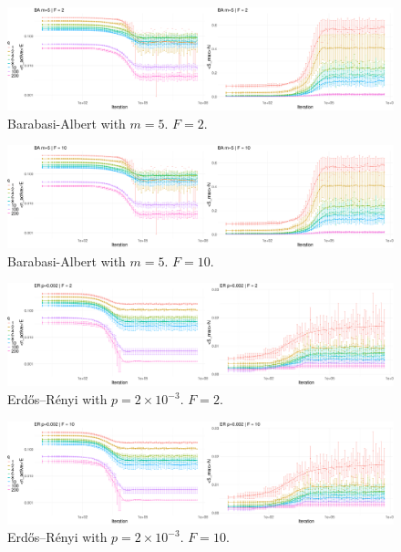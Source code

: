 \begin{figure}[h] 
    \centering
    \includegraphics[width=1\textwidth]{images/task30/BA_5_2.png} 
    \vspace{-0.5cm}
    \caption{Barabasi-Albert with $m=5$. $F=2$.} 
\end{figure}

\begin{figure}[h] 
    \centering
    \includegraphics[width=1\textwidth]{images/task30/BA_5_10.png} 
    \vspace{-0.5cm}
    \caption{Barabasi-Albert with $m=5$. $F=10$.} 
\end{figure}

\begin{figure}[h] 
    \centering
    \includegraphics[width=1\textwidth]{images/task30/ER_0-002_2.png} 
    \vspace{-0.5cm}
    \caption{Erdős–Rényi with $p=2\times10^{-3}$. $F=2$.} 
\end{figure}


\begin{figure}[h] 
    \centering
    \includegraphics[width=1\textwidth]{images/task30/ER_0-002_10.png} 
    \vspace{-0.5cm}
    \caption{Erdős–Rényi with $p=2\times10^{-3}$. $F=10$.} 
\end{figure}


